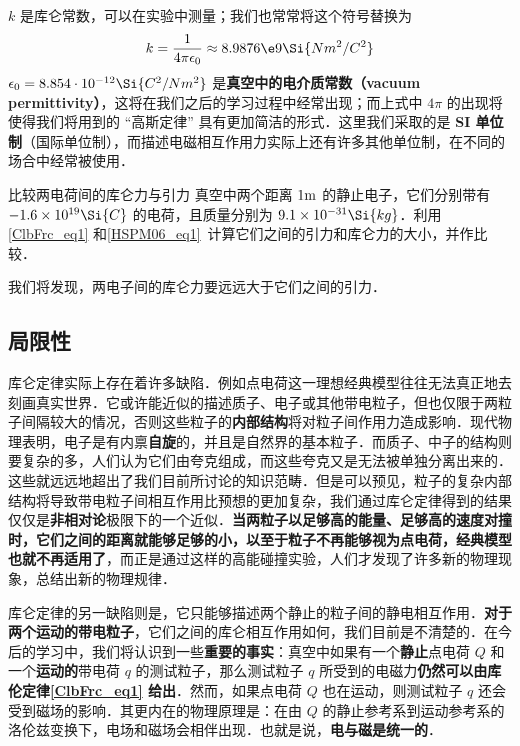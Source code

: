 $k$ 是库仑常数，可以在实验中测量；我们也常常将这个符号替换为
\begin{equation}
k = \frac{1}{4\pi\epsilon_0} \approx 8.9876\e9 \Si{N m^2/C^2}
\end{equation}
$\epsilon_0=8.854\cdot 10^{-12} \Si{C^2/Nm^2}$ 是\textbf{真空中的电介质常数（vacuum permittivity）}，这将在我们之后的学习过程中经常出现；而上式中 $4\pi$ 的出现将使得我们将用到的 “高斯定律” 具有更加简洁的形式．这里我们采取的是\textbf{ SI 单位制}（国际单位制），而描述电磁相互作用力实际上还有许多其他单位制，在不同的场合中经常被使用．

\begin{exercise}{比较两电荷间的库仑力与引力}
真空中两个距离 $1 \rm m$ 的静止电子，它们分别带有 $-1.6\times 10^{19} \Si{C}$ 的电荷，且质量分别为 $9.1\times 10^{-31} \Si{kg}$．利用\autoref{ClbFrc_eq1} 和\autoref{HSPM06_eq1}~计算它们之间的引力和库仑力的大小，并作比较．
\end{exercise}
我们将发现，两电子间的库仑力要远远大于它们之间的引力．
\subsection{局限性}
库仑定律实际上存在着许多缺陷．例如点电荷这一理想经典模型往往无法真正地去刻画真实世界．它或许能近似的描述质子、电子或其他带电粒子，但也仅限于两粒子间隔较大的情况，否则这些粒子的\textbf{内部结构}将对粒子间作用力造成影响．现代物理表明，电子是有内禀\textbf{自旋}的，并且是自然界的基本粒子．而质子、中子的结构则要复杂的多，人们认为它们由夸克组成，而这些夸克又是无法被单独分离出来的．这些就远远地超出了我们目前所讨论的知识范畴．但是可以预见，粒子的复杂内部结构将导致带电粒子间相互作用比预想的更加复杂，我们通过库仑定律得到的结果仅仅是\textbf{非相对论}极限下的一个近似．\textbf{当两粒子以足够高的能量、足够高的速度对撞时，它们之间的距离就能够足够的小，以至于粒子不再能够视为点电荷，经典模型也就不再适用了}，而正是通过这样的高能碰撞实验，人们才发现了许多新的物理现象，总结出新的物理规律．

库仑定律的另一缺陷则是，它只能够描述两个静止的粒子间的静电相互作用．\textbf{对于两个运动的带电粒子}，它们之间的库仑相互作用如何，我们目前是不清楚的．在今后的学习中，我们将认识到一些\textbf{重要的事实}：真空中如果有一个\textbf{静止}点电荷 $Q$ 和一个\textbf{运动的}带电荷 $q$ 的测试粒子，那么测试粒子 $q$ 所受到的电磁力\textbf{仍然可以由库伦定律\autoref{ClbFrc_eq1} 给出}．然而，如果点电荷 $Q$ 也在运动，则测试粒子 $q$ 还会受到磁场的影响．其更内在的物理原理是：在由 $Q$ 的静止参考系到运动参考系的洛伦兹变换下，电场和磁场会相伴出现．也就是说，\textbf{电与磁是统一的}．